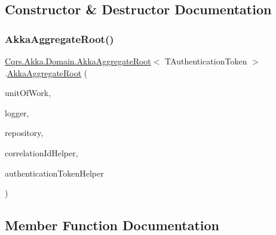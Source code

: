 \subsection{Constructor \& Destructor Documentation}
\mbox{\label{classCqrs_1_1Akka_1_1Domain_1_1AkkaAggregateRoot_a060f981e4c3023aec36e7c6f1cfb3a9d_a060f981e4c3023aec36e7c6f1cfb3a9d}} 
\subsubsection{\texorpdfstring{Akka\+Aggregate\+Root()}{AkkaAggregateRoot()}}
{\footnotesize\ttfamily \hyperlink{classCqrs_1_1Akka_1_1Domain_1_1AkkaAggregateRoot}{Cqrs.\+Akka.\+Domain.\+Akka\+Aggregate\+Root}$<$ T\+Authentication\+Token $>$.\hyperlink{classCqrs_1_1Akka_1_1Domain_1_1AkkaAggregateRoot}{Akka\+Aggregate\+Root} (\begin{DoxyParamCaption}\item[{\hyperlink{interfaceCqrs_1_1Domain_1_1IUnitOfWork}{I\+Unit\+Of\+Work}$<$ T\+Authentication\+Token $>$}]{unit\+Of\+Work,  }\item[{I\+Logger}]{logger,  }\item[{\hyperlink{interfaceCqrs_1_1Akka_1_1Domain_1_1IAkkaAggregateRepository}{I\+Akka\+Aggregate\+Repository}$<$ T\+Authentication\+Token $>$}]{repository,  }\item[{I\+Correlation\+Id\+Helper}]{correlation\+Id\+Helper,  }\item[{\hyperlink{interfaceCqrs_1_1Authentication_1_1IAuthenticationTokenHelper}{I\+Authentication\+Token\+Helper}$<$ T\+Authentication\+Token $>$}]{authentication\+Token\+Helper }\end{DoxyParamCaption})\hspace{0.3cm}{\ttfamily [protected]}}



\subsection{Member Function Documentation}
\mbox{\label{classCqrs_1_1Akka_1_1Domain_1_1AkkaAggregateRoot_aaa135cb26be9e5353986f5611f05c059_aaa135cb26be9e5353986f5611f05c059}} 
